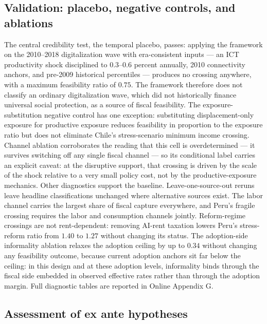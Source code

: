 \documentclass[11pt,a4paper]{article}
\begin{document}
\subsection{Validation: placebo, negative controls, and ablations}\label{subsec:results_diagnostics}

The central credibility test, the temporal placebo, passes: applying the framework
on the 2010--2018 digitalization wave with era-consistent inputs --- an ICT
productivity shock disciplined to $0.3$--$0.6$ percent annually, 2010 connectivity anchors,
and pre-2009 historical percentiles --- produces no crossing anywhere, with a maximum
feasibility ratio of $0.75$. The framework therefore does not classify an ordinary digitalization wave, which did not historically finance universal social protection, as a source of fiscal feasibility.
The exposure-substitution negative control has one exception: substituting displacement-only exposure for productive exposure reduces feasibility in proportion to the exposure ratio but does not eliminate Chile's stress-scenario minimum income crossing. Channel ablation
corroborates the reading that this cell is overdetermined --- it survives switching off any
single fiscal channel --- so its conditional label carries an explicit caveat: at the
disruptive support, that crossing is driven by the scale of the shock relative to a very
small policy cost, not by the productive-exposure mechanics. Other diagnostics support the
baseline. Leave-one-source-out reruns leave headline classifications
unchanged where alternative sources exist. The labor channel carries the largest share of
fiscal capture everywhere, and Peru's fragile crossing requires the labor and consumption
channels jointly. Reform-regime crossings are not rent-dependent: removing AI-rent taxation
lowers Peru's stress-reform ratio from $1.40$ to $1.27$ without changing its status.
The adoption-side informality ablation relaxes the adoption ceiling by up to
$0.34$ without changing any feasibility outcome, because current adoption anchors sit far
below the ceiling: in this design and at these adoption levels, informality binds through
the fiscal side embedded in observed effective rates rather than through the adoption
margin. Full diagnostic tables are reported in Online Appendix G.
\subsection{Assessment of ex ante hypotheses}\label{subsec:results_adjudication}
\end{document}
